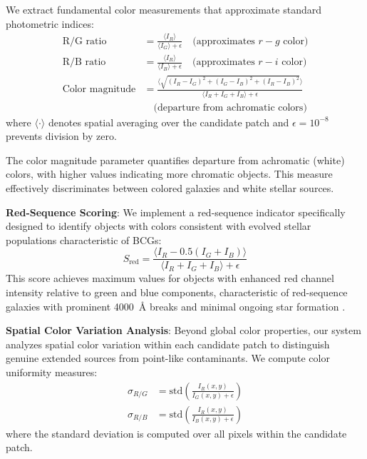 \documentclass[twocolumn,10pt]{aastex631}
\begin{document}
We extract fundamental color measurements that approximate standard photometric indices:
\begin{align}
\text{R/G ratio} &= \frac{\langle I_R \rangle}{\langle I_G \rangle + \epsilon} \quad \text{(approximates } r-g \text{ color)} \\
\text{R/B ratio} &= \frac{\langle I_R \rangle}{\langle I_B \rangle + \epsilon} \quad \text{(approximates } r-i \text{ color)} \\
\text{Color magnitude} &= \frac{\langle\sqrt{(I_R-I_G)^2 + (I_G-I_B)^2 + (I_R-I_B)^2}\rangle}{\langle I_R + I_G + I_B \rangle + \epsilon} \nonumber \\
&\quad \text{(departure from achromatic colors)}
\end{align}
where $\langle \cdot \rangle$ denotes spatial averaging over the candidate patch and $\epsilon = 10^{-8}$ prevents division by zero.

The color magnitude parameter quantifies departure from achromatic (white) colors, with higher values indicating more chromatic objects. This measure effectively discriminates between colored galaxies and white stellar sources.

\textbf{Red-Sequence Scoring}: We implement a red-sequence indicator specifically designed to identify objects with colors consistent with evolved stellar populations characteristic of BCGs:
\begin{equation}
S_{\text{red}} = \frac{\langle I_R - 0.5(I_G + I_B) \rangle}{\langle I_R + I_G + I_B \rangle + \epsilon}
\end{equation}
This score achieves maximum values for objects with enhanced red channel intensity relative to green and blue components, characteristic of red-sequence galaxies with prominent 4000~Å breaks and minimal ongoing star formation \citep{Kodama1997,Gladders2000}.

\textbf{Spatial Color Variation Analysis}: Beyond global color properties, our system analyzes spatial color variation within each candidate patch to distinguish genuine extended sources from point-like contaminants. We compute color uniformity measures:
\begin{align}
\sigma_{R/G} &= \text{std}\left(\frac{I_R(x,y)}{I_G(x,y) + \epsilon}\right) \\
\sigma_{R/B} &= \text{std}\left(\frac{I_R(x,y)}{I_B(x,y) + \epsilon}\right)
\end{align}
where the standard deviation is computed over all pixels within the candidate patch.
\end{document}
